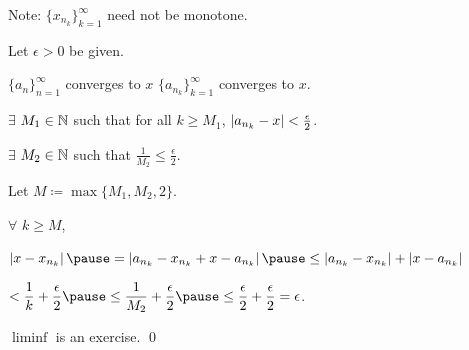 \documentclass[10pt,aspectratio=149]{beamer}
\begin{document}
\begin{frame}

Note: $\{ x_{n_k} \}_{k=1}^\infty$ need not be monotone.

\pause
\medskip

Let $\epsilon > 0$ be given.

\pause
\medskip

$\{ a_n \}_{n=1}^\infty$ converges to $x$ \wthus $\{ a_{n_k} \}_{k=1}^\infty$ converges to $x$.

\pause
\medskip

$\exists$ $M_1 \in {\mathbb{N}}$ such that for all $k \geq M_1$, \quad
$\left\lvert {a_{n_k} - x} \right\rvert < \frac{\epsilon}{2}$.

\pause
\medskip

$\exists$ $M_2 \in {\mathbb{N}}$ such that
\quad $\displaystyle \frac{1}{M_2} \leq \frac{\epsilon}{2}$.

\pause
\medskip

Let $M \coloneqq \max \{M_1 , M_2 , 2 \}$.

\pause
\medskip

$\forall$ $k \geq M$,

\medskip

$\displaystyle
\abs{x- x_{n_k}}
\pause
=
\abs{a_{n_k} - x_{n_k} + x - a_{n_k}}
\pause
\leq
\abs{a_{n_k} - x_{n_k}} + \abs{x - a_{n_k}}$

\pause
\medskip

\qquad
$\displaystyle
< \frac{1}{k} + \frac{\epsilon}{2}
\pause
\leq \frac{1}{M_2} + \frac{\epsilon}{2}
\pause
\leq \frac{\epsilon}{2} +
\frac{\epsilon}{2} = \epsilon$.

\pause
\medskip

$\liminf$ is an exercise.
\qed

\end{frame}
\end{document}
